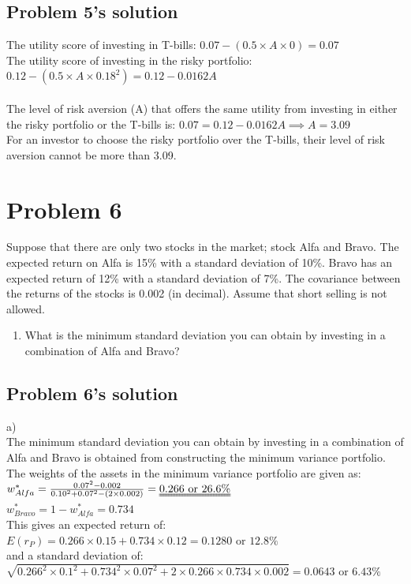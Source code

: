 \documentclass[10]{article}
\begin{document}
\color{blue}
\subsection*{Problem 5's solution}
The utility score of investing in T-bills: $0.07 - (0.5 \times A \times 0) = 0.07$\\
The utility score of investing in the risky portfolio: $0.12 - (0.5 \times A \times 0.18^2) = 0.12 - 0.0162A $\\
\\
The level of risk aversion (A) that offers the same utility from investing in either the risky portfolio or the T-bills is:
$0.07 = 0.12 - 0.0162A \implies A = 3.09$\\
For an investor to choose the risky portfolio over the T-bills, their level of risk aversion cannot be more than 3.09.


\color{black}
\section*{Problem 6}
Suppose that there are only two stocks in the market; stock Alfa and Bravo. The expected return on Alfa is 15\% with a standard deviation of 10\%. Bravo has an expected return of 12\% with a standard deviation of 7\%. The covariance between the returns of the stocks is 0.002 (in decimal). Assume that short selling is not allowed.
\begin{enumerate}
    \item[a)] What is the minimum standard deviation you can obtain by investing in a combination of Alfa and Bravo?
\end{enumerate}


\color{blue}
\subsection*{Problem 6's solution}
a)\\
The minimum standard deviation you can obtain by investing in a combination of Alfa and Bravo is obtained from constructing the minimum variance portfolio. The weights of the assets in the minimum variance portfolio are given as:\\
$w^*_{Alfa} = \frac{0.07^2 - 0.002}{0.10^2 + 0.07^2 - (2\times0.002)} = \uuline{0.266 \text{ or }26.6\%} $\\
$w^*_{Bravo} = 1- w^*_{Alfa} = 0.734$\\
This gives an expected return of: $E(r_P) = 0.266\times0.15 + 0.734\times0.12 = 0.1280 \text{ or } 12.8\%$\\
and a standard deviation of: $\sqrt{0.266^2\times0.1^2 + 0.734^2\times0.07^2 + 2\times0.266\times0.734\times0.002} = 0.0643 \text{ or } 6.43\%$\\
\end{document}
